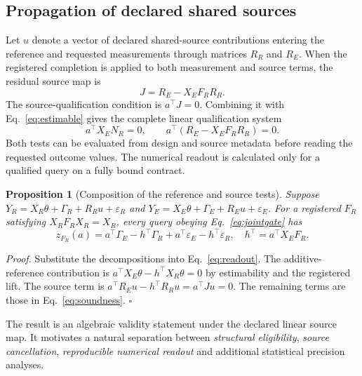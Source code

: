 \documentclass[preprint,11pt,times,number,sort&compress]{elsarticle}
\newtheorem{proposition}{Proposition}
\begin{document}
\subsection{Propagation of declared shared sources}
Let $u$ denote a vector of declared shared-source contributions entering the reference and requested measurements through matrices $R_R$ and $R_E$. When the registered completion is applied to both measurement and source terms, the residual source map is
\begin{equation}
J=R_E-X_EF_RR_R.
\label{eq:source}
\end{equation}
The source-qualification condition is $a^\top J=0$. Combining it with Eq.~\ref{eq:estimable} gives the complete linear qualification system
\begin{equation}
\boxed{a^\top X_EN_R=0,\qquad a^\top(R_E-X_EF_RR_R)=0.}
\label{eq:jointgate}
\end{equation}
Both tests can be evaluated from design and source metadata before reading the requested outcome values. The numerical readout is calculated only for a qualified query on a fully bound contract.

\begin{proposition}[Composition of the reference and source tests]\label{prop:soundness}
Suppose $Y_R=X_R\theta+\Gamma_R+R_Ru+\varepsilon_R$ and $Y_E=X_E\theta+\Gamma_E+R_Eu+\varepsilon_E$. For a registered $F_R$ satisfying $X_RF_RX_R=X_R$, every query obeying Eq.~\ref{eq:jointgate} has
\begin{equation}
z_{F_R}(a)=a^\top\Gamma_E-h^\top\Gamma_R
+a^\top\varepsilon_E-h^\top\varepsilon_R,
\quad h^\top=a^\top X_EF_R.
\label{eq:soundness}
\end{equation}
\end{proposition}
\noindent\emph{Proof.} Substitute the decompositions into Eq.~\ref{eq:readout}. The additive-reference contribution is $a^\top X_E\theta-h^\top X_R\theta=0$ by estimability and the registered lift. The source term is $a^\top R_Eu-h^\top R_Ru=a^\top Ju=0$. The remaining terms are those in Eq.~\ref{eq:soundness}. $\square$

The result is an algebraic validity statement under the declared linear source map. It motivates a natural separation between \emph{structural eligibility}, \emph{source cancellation}, \emph{reproducible numerical readout} and additional statistical precision analyses.
\end{document}
